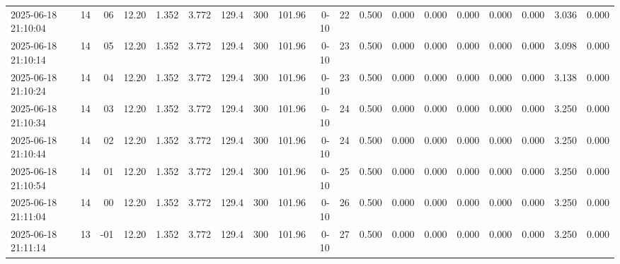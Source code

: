 \documentclass[UTF8,10pt,a4paper,fontset=fandol]{ctexart}
\begin{document}
\begin{tabular}{|p{2.55cm}|r|r|r|r|r|r|r|r|r|r|r|r|r|r|r|r|r|r|}
2025-06-18 21:10:04 & 14 & 06 & 12.20 & 1.352 & 3.772 & 129.4 & 300 & 101.96 & 0-10 & 22 & 0.500 & 0.000 & 0.000 & 0.000 & 0.000 & 0.000 & 3.036 & 0.000 \\
2025-06-18 21:10:14 & 14 & 05 & 12.20 & 1.352 & 3.772 & 129.4 & 300 & 101.96 & 0-10 & 23 & 0.500 & 0.000 & 0.000 & 0.000 & 0.000 & 0.000 & 3.098 & 0.000 \\
2025-06-18 21:10:24 & 14 & 04 & 12.20 & 1.352 & 3.772 & 129.4 & 300 & 101.96 & 0-10 & 23 & 0.500 & 0.000 & 0.000 & 0.000 & 0.000 & 0.000 & 3.138 & 0.000 \\
2025-06-18 21:10:34 & 14 & 03 & 12.20 & 1.352 & 3.772 & 129.4 & 300 & 101.96 & 0-10 & 24 & 0.500 & 0.000 & 0.000 & 0.000 & 0.000 & 0.000 & 3.250 & 0.000 \\
2025-06-18 21:10:44 & 14 & 02 & 12.20 & 1.352 & 3.772 & 129.4 & 300 & 101.96 & 0-10 & 24 & 0.500 & 0.000 & 0.000 & 0.000 & 0.000 & 0.000 & 3.250 & 0.000 \\
2025-06-18 21:10:54 & 14 & 01 & 12.20 & 1.352 & 3.772 & 129.4 & 300 & 101.96 & 0-10 & 25 & 0.500 & 0.000 & 0.000 & 0.000 & 0.000 & 0.000 & 3.250 & 0.000 \\
2025-06-18 21:11:04 & 14 & 00 & 12.20 & 1.352 & 3.772 & 129.4 & 300 & 101.96 & 0-10 & 26 & 0.500 & 0.000 & 0.000 & 0.000 & 0.000 & 0.000 & 3.250 & 0.000 \\
2025-06-18 21:11:14 & 13 & -01 & 12.20 & 1.352 & 3.772 & 129.4 & 300 & 101.96 & 0-10 & 27 & 0.500 & 0.000 & 0.000 & 0.000 & 0.000 & 0.000 & 3.250 & 0.000 \\
\hline
\end{tabular}

\newpage
\end{document}
